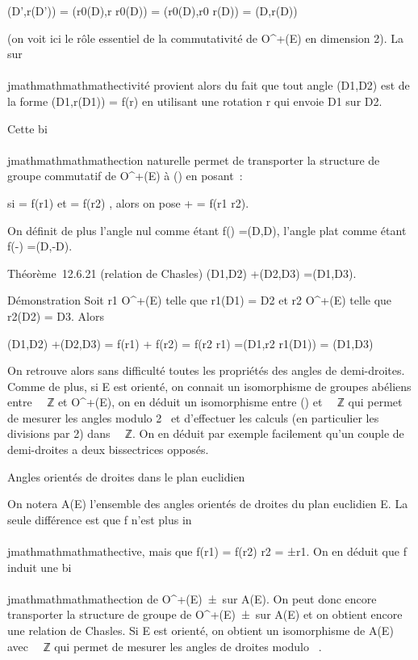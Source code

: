 \widehat(D',r(D')) =\widehat
(r0(D),r \cdot r0(D)) =\widehat
(r0(D),r0 \cdot r(D)) =\widehat
(D,r(D))

(on voit ici le rôle essentiel de la commutativité de O^+(E)
en dimension 2). La sur\\\\jmathmathmathmathectivité provient alors du fait que tout angle
\widehat(D1,D2) est de la forme
\widehat(D1,r(D1)) = f(r) en
utilisant une rotation r qui envoie D1 sur D2.

Cette bi\\\\jmathmathmathmathection naturelle permet de transporter la structure de groupe
commutatif de O^+(E) à \tildeA() en
posant~:

si  = f(r1) et  = f(r2) ,
alors on pose  +  = f(r1 \cdot
r2).

On définit de plus l'angle nul comme étant
f(\mathrmId) =\widehat (D,D),
l'angle plat comme étant f(-\mathrmId)
=\widehat (D,-D).

Théorème~12.6.21 (relation de Chasles)
\widehat(D1,D2)
+\widehat (D2,D3)
=\widehat (D1,D3).

Démonstration Soit r1 \in O^+(E) telle que
r1(D1) = D2 et r2 \in
O^+(E) telle que r2(D2) = D3.
Alors

\widehat(D1,D2)
+\widehat (D2,D3) =
f(r1) + f(r2) = f(r2 \cdot r1)
=\widehat (D1,r2 \cdot
r1(D1)) =\widehat
(D1,D3)

On retrouve alors sans difficulté toutes les propriétés des angles de
demi-droites. Comme de plus, si E est orienté, on connait un
isomorphisme de groupes abéliens entre ~\pi~ℤ et O^+(E), on en
déduit un isomorphisme entre \tildeA() et ~\pi~ℤ qui
permet de mesurer les angles modulo 2\pi~ et d'effectuer les calculs (en
particulier les divisions par 2) dans ~\pi~ℤ. On en déduit par exemple
facilement qu'un couple de demi-droites a deux bissectrices opposés.

Angles orientés de droites dans le plan euclidien

On notera A(E) l'ensemble des angles orientés de droites du plan
euclidien E. La seule différence est que f n'est plus in\\\\jmathmathmathmathective, mais
que f(r1) = f(r2) \Leftrightarrow
r2 = ±r1. On en déduit que f induit une bi\\\\jmathmathmathmathection
\tildef de O^+(E)\diagup\
±\mathrmId\ sur A(E). On peut donc
encore transporter la structure de groupe de
O^+(E)\diagup\
±\mathrmId\ sur A(E) et on obtient
encore une relation de Chasles. Si E est orienté, on obtient un
isomorphisme de A(E) avec ~\diagup\pi~ℤ qui permet de mesurer les angles de
droites modulo \pi~.

